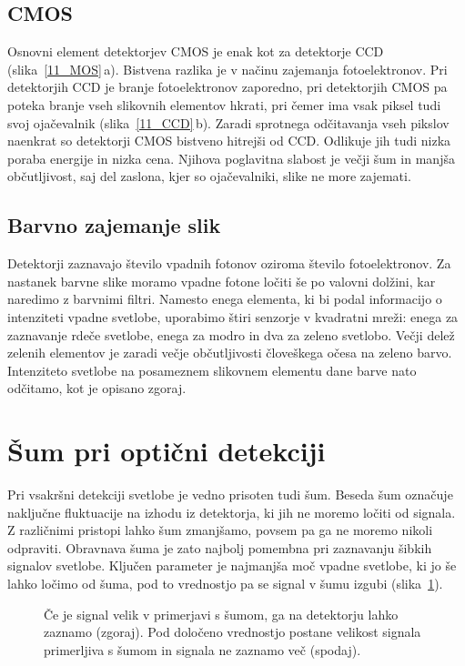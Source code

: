 \subsection*{CMOS}
Osnovni element detektorjev CMOS je enak kot za detektorje CCD (slika~\ref{11_MOS}\,a). 
Bistvena razlika je v načinu zajemanja fotoelektronov. Pri detektorjih CCD je branje 
fotoelektronov zaporedno, pri detektorjih CMOS pa poteka branje vseh slikovnih elementov 
hkrati, pri čemer ima vsak piksel tudi svoj ojačevalnik (slika~\ref{11_CCD}\,b).
Zaradi sprotnega odčitavanja vseh pikslov naenkrat so detektorji CMOS bistveno hitrejši 
od CCD. Odlikuje jih tudi nizka poraba energije in nizka cena. Njihova poglavitna slabost
je večji šum in manjša občutljivost, saj del zaslona, kjer so ojačevalniki, slike ne more
zajemati. 

\subsection*{Barvno zajemanje slik}
Detektorji zaznavajo število vpadnih fotonov oziroma število fotoelektronov.
Za nastanek barvne slike moramo vpadne fotone ločiti še po valovni dolžini, kar naredimo
z barvnimi filtri. Namesto enega elementa, ki bi podal informacijo o intenziteti vpadne 
svetlobe, uporabimo štiri senzorje v kvadratni mreži: enega za zaznavanje rdeče svetlobe,
enega za modro in dva za zeleno svetlobo.
Večji delež zelenih elementov je zaradi večje občutljivosti človeškega očesa na zeleno barvo. 
Intenziteto svetlobe na posameznem slikovnem elementu dane barve nato odčitamo, kot je
opisano zgoraj.
 
\section{Šum pri optični detekciji}
\label{chap:sum}
Pri vsakršni detekciji svetlobe je vedno prisoten tudi šum. Beseda šum označuje naključne 
fluktuacije na izhodu iz detektorja, ki jih ne moremo ločiti od signala. Z različnimi 
pristopi lahko šum zmanjšamo, povsem pa ga ne moremo nikoli odpraviti. Obravnava 
šuma je zato najbolj pomembna pri zaznavanju šibkih signalov svetlobe. Ključen
parameter je najmanjša moč vpadne svetlobe, ki jo še lahko ločimo od šuma, pod to vrednostjo 
pa se signal v šumu izgubi (slika~\ref{11_sum}).
\begin{figure}[h]
\centering
\def\svgwidth{140truemm} 

\caption{Če je signal velik v primerjavi s šumom, ga na detektorju lahko zaznamo (zgoraj). 
Pod določeno vrednostjo postane velikost signala primerljiva s šumom in signala ne zaznamo več
(spodaj).}
\label{11_sum}
\end{figure}

